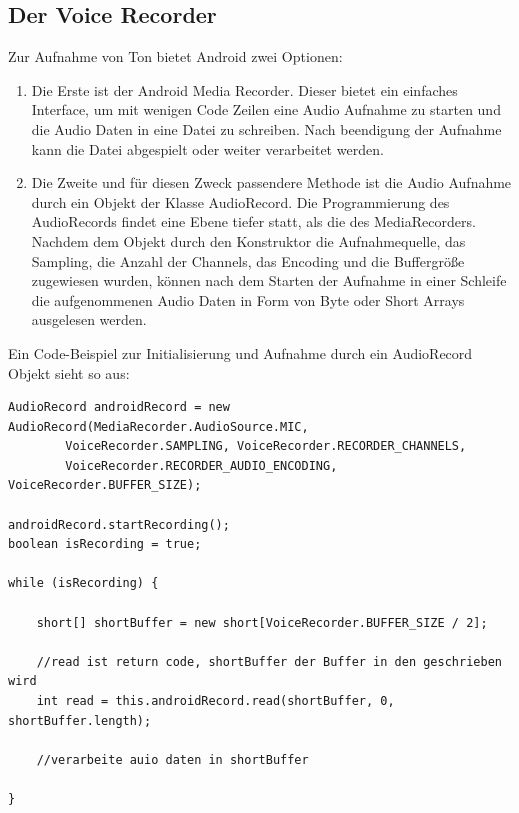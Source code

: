 \subsection{Der Voice Recorder}
Zur Aufnahme von Ton bietet Android zwei Optionen\cite{Recording Optionen}:
\begin{enumerate}
	\item Die Erste ist der Android Media Recorder. Dieser bietet ein einfaches Interface, um mit wenigen Code Zeilen eine Audio Aufnahme zu starten und die Audio Daten in eine Datei zu schreiben. Nach beendigung der Aufnahme kann die Datei abgespielt oder weiter verarbeitet werden.
	\item Die Zweite und für diesen Zweck passendere Methode ist die Audio Aufnahme durch ein Objekt der Klasse AudioRecord. Die Programmierung des AudioRecords findet eine Ebene tiefer statt, als die des MediaRecorders. Nachdem dem Objekt durch den Konstruktor die Aufnahmequelle, das Sampling, die Anzahl der Channels, das Encoding und die Buffergröße zugewiesen wurden, können nach dem Starten der Aufnahme in einer Schleife die aufgenommenen Audio Daten in Form von Byte oder Short Arrays ausgelesen werden.
\end{enumerate}
Ein Code-Beispiel zur Initialisierung und Aufnahme durch ein AudioRecord Objekt sieht so aus:
\begin{lstlisting}
AudioRecord androidRecord = new AudioRecord(MediaRecorder.AudioSource.MIC,
		VoiceRecorder.SAMPLING, VoiceRecorder.RECORDER_CHANNELS,
		VoiceRecorder.RECORDER_AUDIO_ENCODING, VoiceRecorder.BUFFER_SIZE);
		
androidRecord.startRecording();
boolean isRecording = true;

while (isRecording) {

	short[] shortBuffer = new short[VoiceRecorder.BUFFER_SIZE / 2];
	
	//read ist return code, shortBuffer der Buffer in den geschrieben wird
	int read = this.androidRecord.read(shortBuffer, 0, shortBuffer.length);
	
	//verarbeite auio daten in shortBuffer
	
}
\end{lstlisting}
